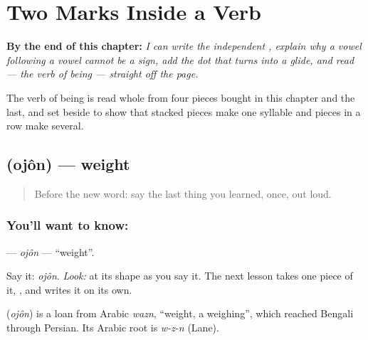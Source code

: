 
\chapter{Two Marks Inside a Verb}
\label{ch:bn-two-marks-inside-a-verb}

\begin{chapteropening}
\textbf{By the end of this chapter:} \emph{I can write the independent , explain why a vowel following a vowel cannot be a sign, add the dot that turns  into a glide, and read  — the verb of being — straight off the page.}

The verb of being is read whole from four pieces bought in this chapter and the last, and set beside  to show that stacked pieces make one syllable and pieces in a row make several.
\end{chapteropening}

\section[\texorpdfstring{\bn{ওজন} (ojôn)}{ওজন (ojôn)}]{ (ojôn) — weight}

\label{lesson:BN-C10-ojon}



\begin{quote}
Before the new word: say the last thing you learned, once, out loud.
\end{quote}

\subsection*{You'll want to know: }
\textbf{} — \emph{ojôn} — \textquotedblleft{}weight\textquotedblright{}.

Say it: \emph{ojôn}. \emph{Look:} at its shape as you say it. The next lesson takes one piece of it, \textbf{}, and writes it on its own.

\begin{cousinweb}
\textbf{} (\emph{ojôn}) is a loan from Arabic \emph{wazn}, \textquotedblleft{}weight, a weighing\textquotedblright{}, which reached Bengali through Persian. Its Arabic root is \emph{w-z-n} (Lane).
\end{cousinweb}

